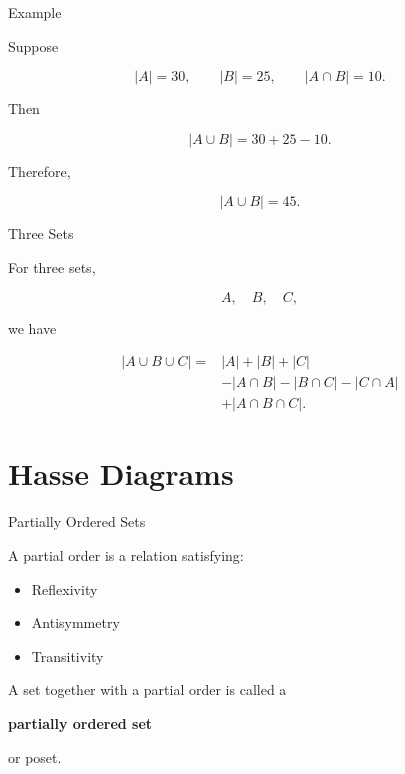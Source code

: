 \documentclass[aspectratio=169,11pt]{beamer}
\begin{document}

\begin{frame}{Example}

Suppose

\[
|A|=30,
\qquad
|B|=25,
\qquad
|A\cap B|=10.
\]

Then

\[
|A\cup B|
=
30+25-10.
\]

Therefore,

\[
\boxed{
|A\cup B|=45.
}
\]

\end{frame}


\begin{frame}{Three Sets}

For three sets,

\[
A,\quad B,\quad C,
\]

we have

\[
\boxed{
\begin{aligned}
|A\cup B\cup C|
={}&|A|+|B|+|C|\\
&-|A\cap B|-|B\cap C|-|C\cap A|\\
&+|A\cap B\cap C|.
\end{aligned}
}
\]

\end{frame}


\section{Hasse Diagrams}


\begin{frame}{Partially Ordered Sets}

A \textcolor{MathGreen}{partial order} is a relation satisfying:

\begin{itemize}

\item Reflexivity

\item Antisymmetry

\item Transitivity

\end{itemize}

\vspace{0.25cm}

A set together with a partial order is called a

\begin{center}

\Large
\textcolor{MathGreen}{\textbf{partially ordered set}}
\end{center}

or \textcolor{MathGreen}{poset}.

\end{frame}
\end{document}
